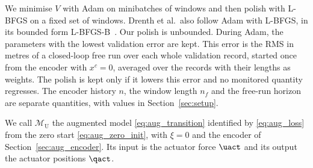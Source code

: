 We minimise $V$ with Adam on minibatches of windows and then polish with
L-BFGS on a fixed set of windows.
Drenth et al.\ also follow Adam with L-BFGS, in its bounded form
L-BFGS-B~\cite[Sec.~5]{drenth2025lpvlfr}.
Our polish is unbounded.
During Adam, the parameters with the lowest validation error are kept.
This error is the RMS in metres of a closed-loop free run over each whole
validation record, started once from the encoder with $x^{c}=0$, averaged over
the records with their lengths as weights.
The polish is kept only if it lowers this error and no monitored quantity
regresses.
The encoder history $n$, the window length $n_f$ and the free-run horizon are
separate quantities, with values in Section~\ref{sec:setup}.

We call $\mathcal M_{\mathrm U}$ the augmented model \eqref{eq:aug_transition}
identified by \eqref{eq:aug_loss} from the zero start \eqref{eq:aug_zero_init},
with $\xi=0$ and the encoder of Section~\ref{sec:aug_encoder}.
Its input is the actuator force $\uact$ and its output the actuator positions
$\qact$.

